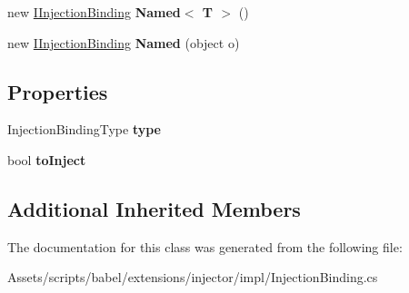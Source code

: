 \begin{DoxyCompactItemize}
\item 
\hypertarget{classbabel_1_1extensions_1_1injector_1_1impl_1_1_injection_binding_a42e9759fe8716681b344e5d4f6351291}{new \hyperlink{interfacebabel_1_1extensions_1_1injector_1_1api_1_1_i_injection_binding}{I\-Injection\-Binding} {\bfseries Named$<$ T $>$} ()}\label{classbabel_1_1extensions_1_1injector_1_1impl_1_1_injection_binding_a42e9759fe8716681b344e5d4f6351291}

\item 
\hypertarget{classbabel_1_1extensions_1_1injector_1_1impl_1_1_injection_binding_ac6ef1b4575e6097f3b265f1d66891c5a}{new \hyperlink{interfacebabel_1_1extensions_1_1injector_1_1api_1_1_i_injection_binding}{I\-Injection\-Binding} {\bfseries Named} (object o)}\label{classbabel_1_1extensions_1_1injector_1_1impl_1_1_injection_binding_ac6ef1b4575e6097f3b265f1d66891c5a}

\end{DoxyCompactItemize}
\subsection*{Properties}
\begin{DoxyCompactItemize}
\item 
\hypertarget{classbabel_1_1extensions_1_1injector_1_1impl_1_1_injection_binding_a6d83b84865d9d329e8446136c35ab7db}{Injection\-Binding\-Type {\bfseries type}}\label{classbabel_1_1extensions_1_1injector_1_1impl_1_1_injection_binding_a6d83b84865d9d329e8446136c35ab7db}

\item 
\hypertarget{classbabel_1_1extensions_1_1injector_1_1impl_1_1_injection_binding_a9feb9e89d5c86557f1870d63347024e8}{bool {\bfseries to\-Inject}}\label{classbabel_1_1extensions_1_1injector_1_1impl_1_1_injection_binding_a9feb9e89d5c86557f1870d63347024e8}

\end{DoxyCompactItemize}
\subsection*{Additional Inherited Members}


The documentation for this class was generated from the following file\-:\begin{DoxyCompactItemize}
\item 
Assets/scripts/babel/extensions/injector/impl/Injection\-Binding.\-cs\end{DoxyCompactItemize}
